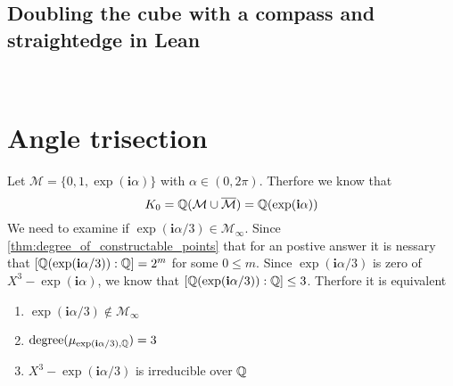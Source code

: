 \documentclass{../Proof_layout_PDF/TemplateExercise}
\begin{document}
\subsection{Doubling the cube with a compass and straightedge in Lean}
\

\section{Angle trisection}
Let $\mathcal{M} = \{0,1,\exp(\textbf{i} \alpha)\}$ with $\alpha \in (0,2\pi)$. Therfore we know that
\begin{equation*}
    K_0 = \mathbb{Q}(\mathcal{M}\cup \overline{\mathcal{M}}) = \mathbb{Q}(\exp(\textbf{i} \alpha))
\end{equation*}
We need to examine if $\exp(\textbf{i} \alpha/3) \in \mathcal{M}_{\infty}$. Since \ref{thm:degree_of_constructable_points}
that for an postive answer it is nessary that $[\mathbb{Q}(\exp(\textbf{i} \alpha/3)):\mathbb{Q}] = 2^m$ for some $0 \le m $. \newline
Since $\exp(\textbf{i} \alpha/3)$ is zero of $X^3 - \exp(\textbf{i} \alpha)$, we know that $[\mathbb{Q}(\exp(\textbf{i} \alpha/3)):\mathbb{Q}] \le 3$.
Therfore it is equivalent
\begin{enumerate}
    \item $\exp(\textbf{i} \alpha/3) \notin \mathcal{M}_{\infty}$
    \item $\text{degree}(\mu_{\exp(\textbf{i} \alpha/3),\mathbb{Q}}) = 3$
    \item $X^3 - \exp(\textbf{i} \alpha/3)$ is irreducible over $\mathbb{Q}$
\end{enumerate}
\end{document}

